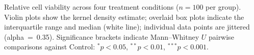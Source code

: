\caption{Relative cell viability across four treatment conditions ($n=100$ per group). Violin plots show the kernel density estimate; overlaid box plots indicate the interquartile range and median (white line); individual data points are jittered (alpha~=~0.35). Significance brackets indicate Mann--Whitney $U$ pairwise comparisons against Control: $^{*}p<0.05$, $^{**}p<0.01$, $^{***}p<0.001$.}
